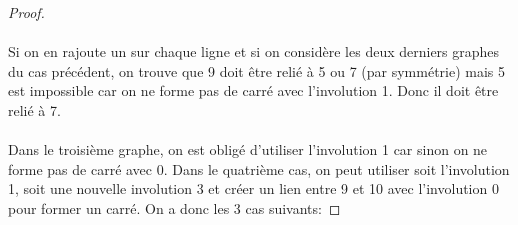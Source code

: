 \begin{proof}
  \begin{center}
  \end{center}

  \paragraph{}
  Si on en rajoute un sur chaque ligne et si on considère les deux derniers graphes du cas précédent, on trouve que 9 doit être relié à 5 ou 7 (par symmétrie) mais 5 est impossible car on ne forme pas de carré avec l'involution 1. Donc il doit être relié à 7.

  \paragraph{}
  Dans le troisième graphe, on est obligé d'utiliser l'involution 1 car sinon on ne forme pas de carré avec 0. Dans le quatrième cas, on peut utiliser soit l'involution 1, soit une nouvelle involution 3 et créer un lien entre 9 et 10 avec l'involution 0 pour former un carré. On a donc les 3 cas suivants:


\end{proof}
